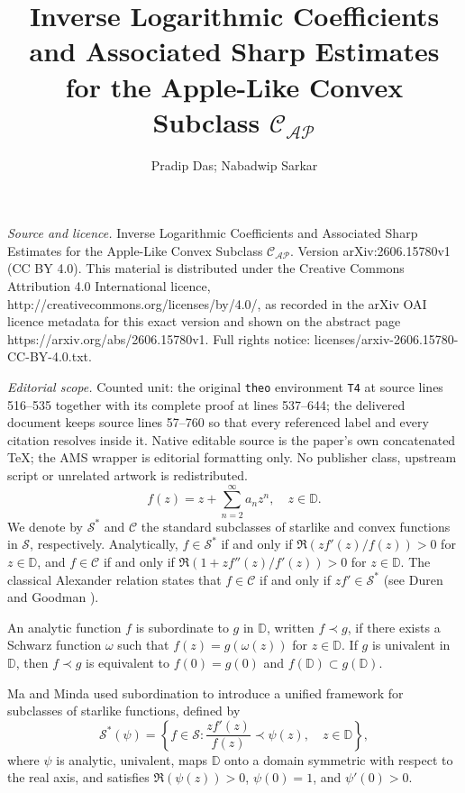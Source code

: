 \documentclass[10pt,a4paper]{amsart}
\numberwithin{equation}{section}
\begin{document}
\title[Inverse Logarithmic Coefficients and Associated Sharp Estima]{Inverse Logarithmic Coefficients and Associated Sharp Estimates for the Apple-Like Convex Subclass $\mathcal{C}_{\mathcal{AP}}$}
\author{Pradip Das; Nabadwip Sarkar}
\date{}
\maketitle
\noindent\emph{Source and licence.} Inverse Logarithmic Coefficients and Associated Sharp Estimates for the Apple-Like Convex Subclass $\mathcal{C}_{\mathcal{AP}}$. Version arXiv:2606.15780v1 (CC BY 4.0). This material is distributed under the Creative Commons Attribution 4.0 International licence, http://creativecommons.org/licenses/by/4.0/, as recorded in the arXiv OAI licence metadata for this exact version and shown on the abstract page https://arxiv.org/abs/2606.15780v1. Full rights notice: licenses/arxiv-2606.15780-CC-BY-4.0.txt.\par\smallskip
\noindent\textit{Editorial scope.} Counted unit: the original \texttt{theo} environment \texttt{T4} at source lines 516--535 together with its complete proof at lines 537--644; the delivered document keeps source lines 57--760 so that every referenced label and every citation resolves inside it. Native editable source is the paper's own concatenated TeX; the AMS wrapper is editorial formatting only. No publisher class, upstream script or unrelated artwork is redistributed.
\begin{equation}\label{eq1}
f(z)=z+\sum_{n=2}^{\infty}a_nz^n, \quad z\in\mathbb{D}.
\end{equation}
We denote by $\mathcal{S}^{\ast}$ and $\mathcal{C}$ the standard subclasses of starlike and convex functions in $\mathcal{S}$, respectively. Analytically, $f \in \mathcal{S}^{\ast}$ if and only if $\Re(zf'(z)/f(z))>0$ for $z\in\mathbb{D}$, and $f \in \mathcal{C}$ if and only if $\Re(1+zf''(z)/f'(z))>0$ for $z\in\mathbb{D}$. The classical Alexander relation states that $f\in\mathcal{C}$ if and only if $zf'\in\mathcal{S}^{\ast}$ (see Duren \cite{PLD1} and Goodman \cite{G}).

An analytic function $f$ is subordinate to $g$ in $\mathbb{D}$, written $f\prec g$, if there exists a Schwarz function $\omega$ such that $f(z)=g(\omega(z))$ for $z\in\mathbb{D}$. If $g$ is univalent in $\mathbb{D}$, then $f\prec g$ is equivalent to $f(0)=g(0)$ and $f(\mathbb{D})\subset g(\mathbb{D})$.

Ma and Minda \cite{MM} used subordination to introduce a unified framework for subclasses of starlike functions, defined by
\[
\mathcal{S}^{\ast}(\psi) = \left\{ f\in\mathcal{S}: \frac{zf'(z)}{f(z)} \prec \psi(z), \quad z\in\mathbb{D}\right\},
\]
where $\psi$ is analytic, univalent, maps $\mathbb{D}$ onto a domain symmetric with respect to the real axis, and satisfies $\Re(\psi(z))>0$, $\psi(0)=1$, and $\psi'(0)>0$.
\end{document}
